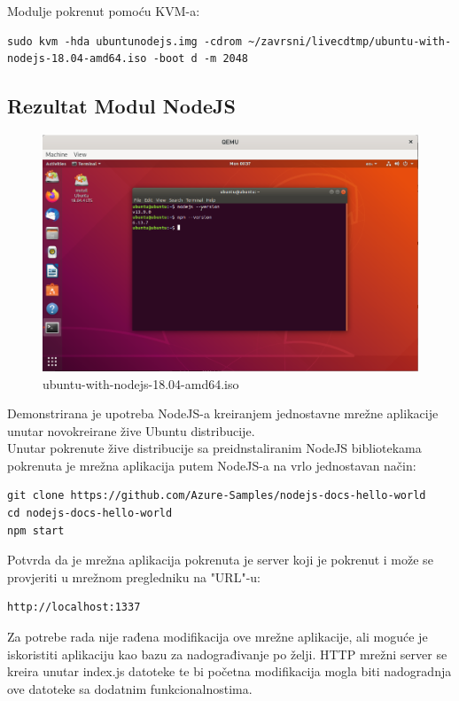 \documentclass[12pt,vi]{mitthesis}
\begin{document}
\noindent 
Modulje pokrenut pomoću KVM-a:
\begin{lstlisting}[style=BashInputStyle]
sudo kvm -hda ubuntunodejs.img -cdrom ~/zavrsni/livecdtmp/ubuntu-with-nodejs-18.04-amd64.iso -boot d -m 2048
\end{lstlisting}

\subsection*{Rezultat Modul NodeJS}
\begin{figure}[!htb]
\centering
\includegraphics[width=\linewidth]{images/ModulNodeJSUbuntu.png}
\caption{ubuntu-with-nodejs-18.04-amd64.iso}
\end{figure}
\indent
Demonstrirana je upotreba NodeJS-a kreiranjem jednostavne mrežne aplikacije unutar novokreirane žive Ubuntu distribucije\cite{nodejs-helloworld-sample}.\\
Unutar pokrenute žive distribucije sa preidnstaliranim NodeJS bibliotekama pokrenuta je mrežna aplikacija putem NodeJS-a na vrlo jednostavan način:
\begin{lstlisting}[style=BashInputStyle]
git clone https://github.com/Azure-Samples/nodejs-docs-hello-world
cd nodejs-docs-hello-world
npm start
\end{lstlisting}
Potvrda da je mrežna aplikacija pokrenuta je server koji je pokrenut i može se provjeriti u mrežnom pregledniku na "URL"-u:
\begin{lstlisting}[style=BashInputStyle]
http://localhost:1337
\end{lstlisting}
Za potrebe rada nije rađena modifikacija ove mrežne aplikacije, ali moguće je iskoristiti aplikaciju kao bazu za nadograđivanje po želji. HTTP mrežni server se kreira unutar index.js datoteke te bi početna modifikacija mogla biti nadogradnja ove datoteke sa dodatnim funkcionalnostima.
\end{document}
